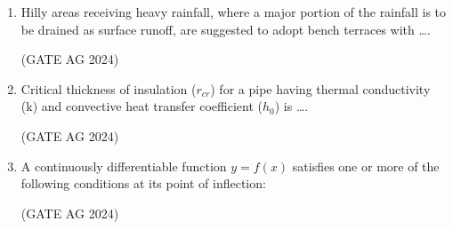 \documentclass[journal]{IEEEtran}
\begin{document}
\begin{enumerate}
     \medskip

\item 
 Hilly areas receiving heavy rainfall, where a major portion of the rainfall is to be drained as surface runoff, are suggested to adopt bench terraces with \dots.
    \begin{enumerate}
    \end{enumerate}
     \hfill(GATE AG 2024)\\

     \medskip

\item
Critical thickness of insulation ($r_{cr}$) for a pipe having thermal conductivity (k) and convective heat transfer coefficient ($h_0$) is \dots.
    \begin{enumerate}
    \end{enumerate}
     \hfill(GATE AG 2024)\\

     \medskip

\item
A continuously differentiable function $y = f(x)$ satisfies one or more of the following conditions at its point of inflection:
    \begin{enumerate}
    \end{enumerate}
     \hfill(GATE AG 2024)\\


\end{enumerate}
\end{document}
